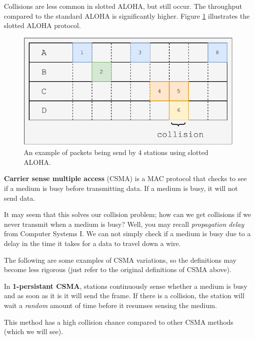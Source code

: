 Collisions are less common in slotted ALOHA, but still occur. The throughput compared to the standard ALOHA is significantly higher. Figure \ref{fig:slotted-aloha} illustrates the slotted ALOHA protocol.

\begin{figure}
    \centering
    \includegraphics[width=0.8\linewidth]{images/slotted-aloha.pdf}
    \caption{An example of packets being send by 4 stations using slotted ALOHA.}
    \label{fig:slotted-aloha}
\end{figure}

\begin{definition}
    \textbf{Carrier sense multiple access} (CSMA) is a MAC protocol that checks to see if a medium is busy before transmitting data. If a medium is busy, it will not send data. 
\end{definition}

It may seem that this solves our collision problem; how can we get collisions if we never transmit when a medium is busy? Well, you may recall \emph{propagation delay} from Computer Systems I. We can not simply check if a medium is busy due to a delay in the time it takes for a data to travel down a wire.

The following are some examples of CSMA variations, so the definitions may become less rigorous (just refer to the original definitions of CSMA above).

\begin{example}
    In \textbf{1-persistant CSMA}, stations continuously sense whether a medium is busy and as soon as it is it will send the frame. If there is a collision, the station will wait a \emph{random} amount of time before it resumses sensing the medium.
\end{example}

This method has a high collision chance compared to other CSMA methods (which we will see).

